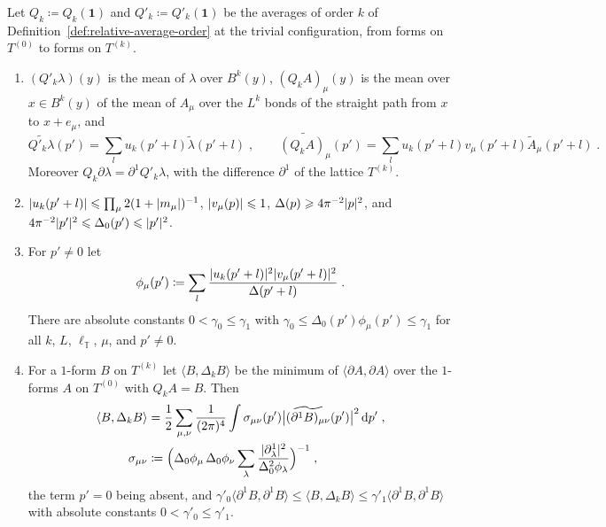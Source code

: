 \documentclass[11pt]{preprint}
\newcommand{\dd}{\mathrm{d}}
\newcommand{\id}{\mathbf 1}
\DeclarePairedDelimiter{\abs}{\lvert}{\rvert}
\numberwithin{equation}{section}
\begin{document}
\begin{proposition}\label{prop:momentum-space}
Let $Q_k \coloneqq Q_k(\id)$ and $Q'_k \coloneqq Q'_k(\id)$ be the averages of order $k$ of Definition~\ref{def:relative-average-order} at the trivial configuration, from forms on $T^{(0)}$ to forms on $T^{(k)}$.
\begin{enumerate}[label=(\roman*)]
\item $(Q'_k\lambda)(y)$ is the mean of $\lambda$ over $B^k(y)$, $(Q_kA)_\mu(y)$ is the mean over $x \in B^k(y)$ of the mean of $A_\mu$ over the $L^k$ bonds of the straight path from $x$ to $x + e_\mu$, and
\begin{equation}\label{eq:average-symbols}
    \widetilde{Q'_k\lambda}(p') = \sum_lu_k(p' + l)\tilde\lambda(p' + l)\;,
    \qquad
    \widetilde{(Q_kA)_\mu}(p') = \sum_lu_k(p' + l)v_\mu(p' + l)\tilde A_\mu(p' + l)\;.
\end{equation}
Moreover $Q_k\partial\lambda = \partial^1Q'_k\lambda$, with the difference $\partial^1$ of the lattice $T^{(k)}$.
\item $\abs{u_k(p' + l)} \leqslant \prod_\mu2(1 + \abs{m_\mu})^{-1}$, $\abs{v_\mu(p)} \leqslant 1$, $\Delta(p) \geqslant 4\pi^{-2}\abs p^2$, and $4\pi^{-2}\abs{p'}^2 \leqslant \Delta_0(p') \leqslant \abs{p'}^2$.
\item For $p' \neq 0$ let
\begin{equation}\label{eq:phi-symbol}
    \phi_\mu(p') \coloneqq \sum_l\frac{\abs{u_k(p' + l)}^2\abs{v_\mu(p' + l)}^2}{\Delta(p' + l)}\;.
\end{equation}
There are absolute constants $0 < \gamma_0 \leqslant \gamma_1$ with $\gamma_0 \leqslant \Delta_0(p')\phi_\mu(p') \leqslant \gamma_1$ for all $k$, $L$, $\ell_{\mathbb T}$, $\mu$, and $p' \neq 0$.
\item For a $1$-form $B$ on $T^{(k)}$ let $\langle B, \Delta_kB\rangle$ be the minimum of $\langle\partial A, \partial A\rangle$ over the $1$-forms $A$ on $T^{(0)}$ with $Q_kA = B$. Then
\begin{equation}\label{eq:minimal-form}
\begin{aligned}
    \langle B, \Delta_kB\rangle &= \frac{1}{2}\sum_{\mu, \nu}\frac{1}{(2\pi)^4}\int\sigma_{\mu\nu}(p')\bigl\lvert\widetilde{(\partial^1B)_{\mu\nu}}(p')\bigr\rvert^2\,\dd p'\;,\\
    \sigma_{\mu\nu} &\coloneqq \Bigl(\Delta_0\phi_\mu\,\Delta_0\phi_\nu\sum_\lambda\frac{\abs{\partial^1_\lambda}^2}{\Delta_0^2\phi_\lambda}\Bigr)^{-1}\;,
\end{aligned}
\end{equation}
the term $p' = 0$ being absent, and $\gamma'_0\langle\partial^1B, \partial^1B\rangle \leqslant \langle B, \Delta_kB\rangle \leqslant \gamma'_1\langle\partial^1B, \partial^1B\rangle$ with absolute constants $0 < \gamma'_0 \leqslant \gamma'_1$.
\end{enumerate}
\end{proposition}
\end{document}
